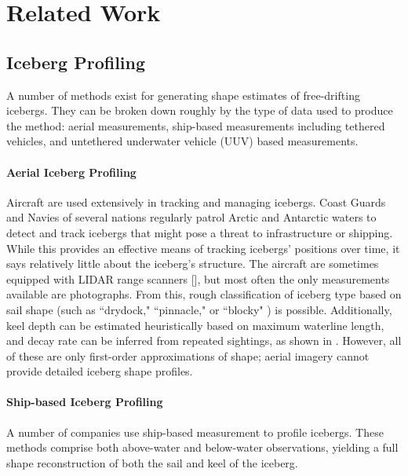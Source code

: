 
\chapter{Related Work}
\label{ch.RelatedWork}

\section{Iceberg Profiling}

A number of methods exist for generating shape estimates of free-drifting icebergs. They can be broken down roughly by the type of data used to produce the method: aerial measurements, ship-based measurements including tethered vehicles, and untethered underwater vehicle (UUV) based measurements.

\subsubsection{Aerial Iceberg Profiling}

Aircraft are used extensively in tracking and managing icebergs. Coast Guards and Navies of several nations regularly patrol Arctic and Antarctic waters to detect and track icebergs that might pose a threat to infrastructure or shipping. While this provides an effective means of tracking icebergs' positions over time, it says relatively little about the iceberg's structure. The aircraft are sometimes equipped with LIDAR range scanners [\cite{?}], but most often the only measurements available are photographs. From this, rough classification of iceberg type based on sail shape (such as ``drydock," ``pinnacle," or ``blocky" ) is possible. Additionally, keel depth can be estimated heuristically based on maximum waterline length, and decay rate can be inferred from repeated sightings, as shown in \cite{OceansLTD2004}. However, all of these are only first-order approximations of shape; aerial imagery cannot provide detailed iceberg shape profiles. 

\subsubsection{Ship-based Iceberg Profiling}

A number of companies use ship-based measurement to profile icebergs. These methods comprise both above-water and below-water observations, yielding a full shape reconstruction of both the sail and keel of the iceberg. 

